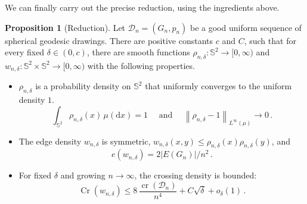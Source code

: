 \documentclass[reqno, 11pt]{amsart}
\theoremstyle{definition}
\newtheorem{proposition}{Proposition}
\newcommand{\norm}[1]{\left\lVert#1\right\rVert}
\newcommand{\dd}{\mathrm{d}}
\begin{document}
We can finally carry out the precise reduction, using the ingredients above.
\begin{proposition}[Reduction]\label{prop:discrete-continuous-reduction}
Let \({\mathcal D}_n=(G_n,p_n)\) be a good uniform sequence of spherical geodesic drawings. There are positive constants $c$ and $C$, such that for every fixed \(\delta \in (0,c)\), there are smooth functions $\rho_{n,\delta}:{\mathbb S}^2\to[0,\infty)$ and $ w_{n,\delta}:{\mathbb S}^2\times{\mathbb S}^2\to[0,\infty)$ with the following properties.
\begin{itemize}
    \item[(i)]  $\rho_{n, \delta}$ is a probability density on ${\mathbb S}^2$ that uniformly converges to the uniform density $1$.  
    \begin{equation}\label{eq:reduction-rho-close}
         \int_{{\mathbb S}^2}\rho_{n,\delta}(x)\,\mu(\dd x)=1
        \quad \text{ and } \quad 
        \norm{\rho_{n,\delta}-1}_{L^\infty(\mu)}\to0\,.
    \end{equation}
    \item[(ii)] The edge density $w_{n,\delta}$ is symmetric, $w_{n,\delta}(x,y)\leq \rho_{n,\delta}(x)\rho_{n,\delta}(y)$, and 
    \begin{equation}
        e(w_{n,\delta}) = 2|E(G_n)|/n^2\,.
    \end{equation}
    \item[(iii)] For fixed $\delta$ and growing $n\to \infty$, the crossing density is bounded: 
    \begin{equation}\label{eq:reduction-crossing-bound}
    \operatorname{Cr}(w_{n,\delta}) \leq 
        8\,\frac{\operatorname{cr}({\mathcal D}_n)}{n^4}
        +C\sqrt{\delta}+o_\delta(1)\,.
\end{equation}
\end{itemize}
\end{proposition}
\end{document}
